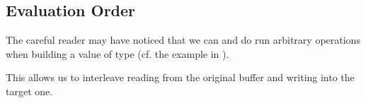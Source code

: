 \subsection{Evaluation Order}

The careful reader may have noticed that we can and do run arbitrary 
operations when building a value of type 
(cf. the  example in ).


This allows us to interleave reading from the original buffer and
writing into the target one.
